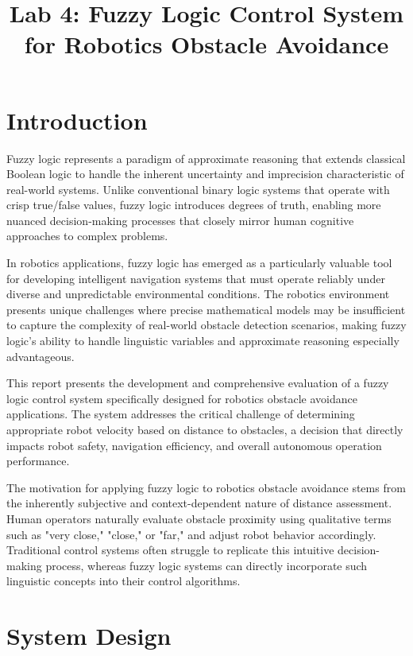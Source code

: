 \documentclass[11pt,a4paper]{article}
\title{Lab 4: Fuzzy Logic Control System for Robotics Obstacle Avoidance}
\date{}
\begin{document}
\maketitle

\section{Introduction}

Fuzzy logic represents a paradigm of approximate reasoning that extends classical Boolean logic to handle the inherent uncertainty and imprecision characteristic of real-world systems. Unlike conventional binary logic systems that operate with crisp true/false values, fuzzy logic introduces degrees of truth, enabling more nuanced decision-making processes that closely mirror human cognitive approaches to complex problems.

In robotics applications, fuzzy logic has emerged as a particularly valuable tool for developing intelligent navigation systems that must operate reliably under diverse and unpredictable environmental conditions. The robotics environment presents unique challenges where precise mathematical models may be insufficient to capture the complexity of real-world obstacle detection scenarios, making fuzzy logic's ability to handle linguistic variables and approximate reasoning especially advantageous.

This report presents the development and comprehensive evaluation of a fuzzy logic control system specifically designed for robotics obstacle avoidance applications. The system addresses the critical challenge of determining appropriate robot velocity based on distance to obstacles, a decision that directly impacts robot safety, navigation efficiency, and overall autonomous operation performance.

The motivation for applying fuzzy logic to robotics obstacle avoidance stems from the inherently subjective and context-dependent nature of distance assessment. Human operators naturally evaluate obstacle proximity using qualitative terms such as "very close," "close," or "far," and adjust robot behavior accordingly. Traditional control systems often struggle to replicate this intuitive decision-making process, whereas fuzzy logic systems can directly incorporate such linguistic concepts into their control algorithms.

\section{System Design}
\end{document}
